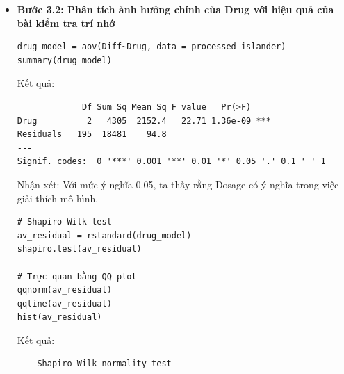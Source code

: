 \begin{itemize}
\item \textbf{Bước 3.2: Phân tích ảnh hưởng chính của Drug với hiệu quả của bài kiểm tra trí nhớ}
    \begin{lstlisting}
drug_model = aov(Diff~Drug, data = processed_islander)
summary(drug_model)
    \end{lstlisting}

\newpage
Kết quả:
    \begin{lstlisting}
             Df Sum Sq Mean Sq F value   Pr(>F)    
Drug          2   4305  2152.4   22.71 1.36e-09 ***
Residuals   195  18481    94.8                     
---
Signif. codes:  0 '***' 0.001 '**' 0.01 '*' 0.05 '.' 0.1 ' ' 1
    \end{lstlisting}
Nhận xét: Với mức ý nghĩa 0.05, ta thấy rằng Dosage có ý nghĩa trong việc giải thích mô hình.

\begin{lstlisting}
# Shapiro-Wilk test
av_residual = rstandard(drug_model)
shapiro.test(av_residual)

# Trực quan bằng QQ plot
qqnorm(av_residual)
qqline(av_residual)
hist(av_residual)
\end{lstlisting}
Kết quả:
\begin{lstlisting}
    Shapiro-Wilk normality test


\end{lstlisting}
\end{itemize}
